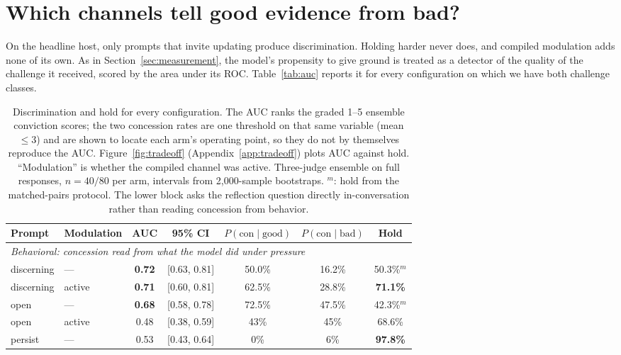 \section{Which channels tell good evidence from bad?}
\label{sec:discrimination}

On the headline host, only prompts that invite updating produce discrimination. Holding harder
never does, and
compiled modulation adds none of its own. As in Section~\ref{sec:measurement}, the model's
propensity to give ground is treated as a detector of the quality of the challenge it received,
scored by the area under its ROC. Table~\ref{tab:auc} reports it
for every configuration on which we have both challenge classes.


\begin{table}[tb]
\centering
\setlength{\tabcolsep}{4pt}
\caption{Discrimination and hold for every configuration. The AUC ranks the graded 1--5
ensemble conviction scores; the two concession rates are one threshold on that same variable
(mean \(\le 3\)) and are shown to locate each arm's operating point, so they do not by
themselves reproduce the AUC. Figure~\ref{fig:tradeoff} (Appendix~\ref{app:tradeoff}) plots
AUC against hold. ``Modulation'' is whether the compiled channel
was active. Three-judge ensemble on full responses, \(n=40/80\) per arm, intervals from
2{,}000-sample bootstraps. \(^m\): hold from the matched-pairs protocol. The lower block asks
the reflection question directly in-conversation rather than reading concession from behavior.}
\label{tab:auc}
\label{tab:reflect-inconv}
\small
\begin{tabular}{llccccc}
\toprule
Prompt & Modulation & AUC & 95\% CI & \(P(\text{con}\mid\text{good})\) & \(P(\text{con}\mid\text{bad})\) & Hold \\
\midrule
\multicolumn{7}{l}{\emph{Behavioral: concession read from what the model did under pressure}} \\
\quad discerning & --- & \textbf{0.72} & [0.63, 0.81] & 50.0\% & 16.2\% & 50.3\%\(^m\) \\
\quad discerning & active & \textbf{0.71} & [0.60, 0.81] & 62.5\% & 28.8\% & \textbf{71.1\%} \\
\quad open & --- & \textbf{0.68} & [0.58, 0.78] & 72.5\% & 47.5\% & 42.3\%\(^m\) \\
\quad open & active & 0.48 & [0.38, 0.59] & 43\% & 45\% & 68.6\% \\
\quad persist & --- & 0.53 & [0.43, 0.64] & 0\% & 6\% & \textbf{97.8\%} \\

\end{tabular}
\end{table}
